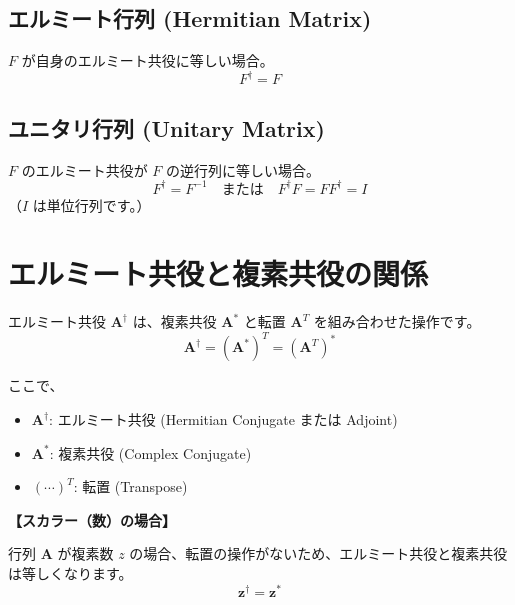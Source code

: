 \documentclass{ltjsarticle}
\begin{document}
\subsection*{エルミート行列 (Hermitian Matrix)}
$F$ が自身のエルミート共役に等しい場合。
$$F^\dagger = F$$

\subsection*{ユニタリ行列 (Unitary Matrix)}
$F$ のエルミート共役が $F$ の逆行列に等しい場合。
$$F^\dagger = F^{-1} \quad \text{または} \quad F^\dagger F = F F^\dagger = I$$
（$I$ は単位行列です。） \\




\section*{エルミート共役と複素共役の関係}

エルミート共役 $\mathbf{A}^\dagger$ は、複素共役 $\mathbf{A}^*$ と転置 $\mathbf{A}^T$ を組み合わせた操作です。 \\

\begin{equation}
    \mathbf{A}^\dagger = (\mathbf{A}^*)^T = (\mathbf{A}^T)^*
\end{equation}

ここで、
\begin{itemize}
    \item $\mathbf{A}^\dagger$: エルミート共役 (Hermitian Conjugate または Adjoint)
    \item $\mathbf{A}^*$: 複素共役 (Complex Conjugate)
    \item $(\cdots)^T$: 転置 (Transpose)
\end{itemize}

\vspace{1em} %

\textbf{【スカラー（数）の場合】}

行列 $\mathbf{A}$ が複素数 $z$ の場合、転置の操作がないため、エルミート共役と複素共役は等しくなります。 \\

\begin{equation}
    \mathbf{z}^\dagger = \mathbf{z}^*
\end{equation}
\end{document}
